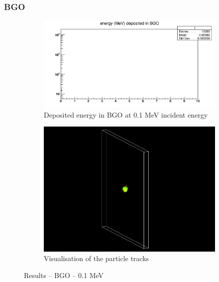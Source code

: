 \documentclass{article}
\begin{document}
\subsubsection{BGO}
\begin{figure}[H]
\centering
\begin{subfigure}{.5\textwidth}
  \centering
  \includegraphics[width=\linewidth]{images/task1/BGO_01MeV.png}
  \caption{Deposited energy in BGO at 0.1 MeV incident energy}
\end{subfigure}%
\begin{subfigure}{.5\textwidth}
  \centering
  \includegraphics[width=\linewidth]{images/task1/BGO_01MeV_10000.png}
  \caption{Visualisation of the particle tracks}
\end{subfigure}
\caption{Results – BGO – 0.1 MeV}
\end{figure}
\end{document}
